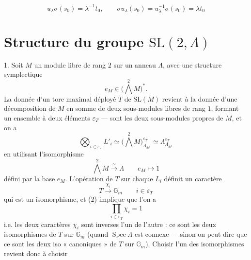 \documentclass[11pt,a4paper]{article}
\begin{document}
\[
u_\lambda \sigma(s_0) = \lambda^{-1} t_0, \qquad
\sigma u_\lambda(s_0) = u_\lambda^{-1} \sigma(s_0) = \lambda t_0
\]

\section{Structure du groupe $\mathrm{SL}(2,\Lambda)$}

1. Soit $M$ un module libre de rang $2$ sur un anneau $\Lambda$, avec une structure symplectique
\[
e_M \in \bigl(\textstyle\bigwedge^2 M\bigr)^* . \tag{1}
\]
La donnée d'un tore maximal déployé $T$ de $\mathrm{SL}(M)$ revient à la donnée d'une décomposition de $M$ en somme de deux sous-modules libres  de rang $1$, formant un ensemble  à deux éléments $\varepsilon_T$ —  \struck{\ill{}} sont les deux sous-modules propres de $M$, et on a
\[
\bigotimes_{i \in \varepsilon_T} L'_i \simeq \bigl(\textstyle\bigwedge^2 M\bigr)_{\Lambda_{\pm 1}}^{\varepsilon_T} \simeq \Lambda_{\Lambda_{\pm 1}}^{\varepsilon_T} \tag{2}
\]
en utilisant l'isomorphisme
\[
\textstyle\bigwedge^2 M \xrightarrow{\ \sim\ } \Lambda \qquad e_M \longmapsto 1 \tag{3}
\]
défini par la base $e_M$. L'opération de $T$ sur chaque $L_i$ définit un caractère
\[
T \xrightarrow{\ \chi_i\ } \mathbb{G}_m \qquad i \in \varepsilon_T \tag{4}
\]
qui est un isomorphisme, et (2) implique que l'on a
\[
\prod_{i \in \varepsilon_T} \chi_i = 1 \tag{5}
\]
i.e. les deux caractères $\chi_i$ sont inverses l'un de l'autre : ce sont les deux isomorphismes  de $T$ sur $\mathbb{G}_m$ (quand $\operatorname{Spec}\Lambda$ est connexe — sinon on peut dire  que ce sont les deux iso « canoniques » de $T$ sur $\mathbb{G}_m$). Choisir l'un des  isomorphismes revient donc à choisir
\end{document}
